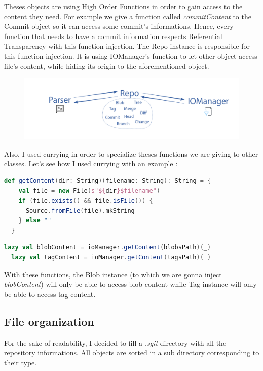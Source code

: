 \documentclass[11pt]{article}
\begin{document}
Theses objects are using High Order Functions in order to gain access to the content they need. For example we give a function called \textit{commitContent} to the Commit object so it can access some commit's informations. Hence, every function that needs to have a commit information respects Referential Transparency with this function injection.
The Repo instance is responsible for this function injection. It is using IOManager's function to let other object access file's content, while hiding its origin to the aforementioned object.

\begin{figure}[h!]
  \centering
  \includegraphics[width=\linewidth]{img/flowDetailled.png}
\end{figure}

Also, I used currying in order to specialize theses functions we are giving to other classes. Let's see how I used currying with an example :

\begin{lstlisting}[language=scala, caption=Function in IOManager]
  def getContent(dir: String)(filename: String): String = {
    val file = new File(s"${dir}$filename")
    if (file.exists() && file.isFile()) {
      Source.fromFile(file).mkString
    } else ""
  }
\end{lstlisting}

\begin{lstlisting}[language=scala, caption=Functions to be injected]
  lazy val blobContent = ioManager.getContent(blobsPath)(_)
  lazy val tagContent = ioManager.getContent(tagsPath)(_)
\end{lstlisting}

With these functions, the Blob instance (to which we are gonna inject \textit{blobContent}) will only be able to access blob content while Tag instance will only be able to access tag content.

\subsection{File organization}

For the sake of readability, I decided to fill a \textit{.sgit} directory with all the repository informations. All objects are sorted in a sub directory corresponding to their type.\\
\end{document}
